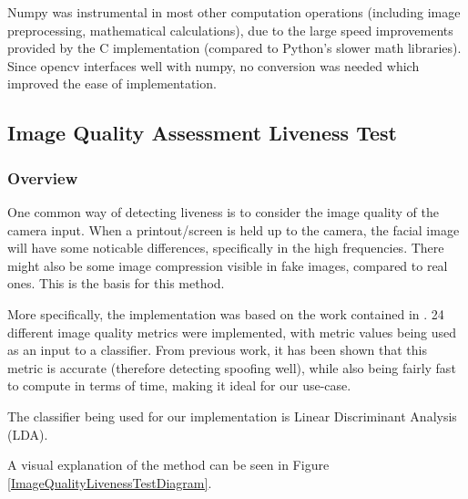 \documentclass[11pt,a4paper]{article}
\begin{document}
            Numpy was instrumental in most other computation operations (including image preprocessing, mathematical calculations), due to the large speed improvements provided by the C implementation (compared to Python's slower math libraries).
            Since opencv interfaces well with numpy, no conversion was needed which improved the ease of implementation.


        \subsection{Image Quality Assessment Liveness Test}
            \subsubsection{Overview}
            One common way of detecting liveness is to consider the image quality of the camera input. When a printout/screen is held up to the camera, the facial image
            will have some noticable differences, specifically in the high frequencies. There might also be some image compression visible in fake images, compared to real ones.
            This is the basis for this method.

            More specifically, the implementation was based on the work contained in \cite{ImageQualityAssessmentTest}. 24 different image quality metrics were implemented,
            with metric values being used as an input to a classifier. From previous work, it has been shown that this metric is accurate (therefore detecting spoofing well), while
            also being fairly fast to compute in terms of time, making it ideal for our use-case.

            The classifier being used for our implementation is Linear Discriminant Analysis (LDA).

            A visual explanation of the method can be seen in Figure \ref{ImageQualityLivenessTestDiagram}. 
\end{document}
